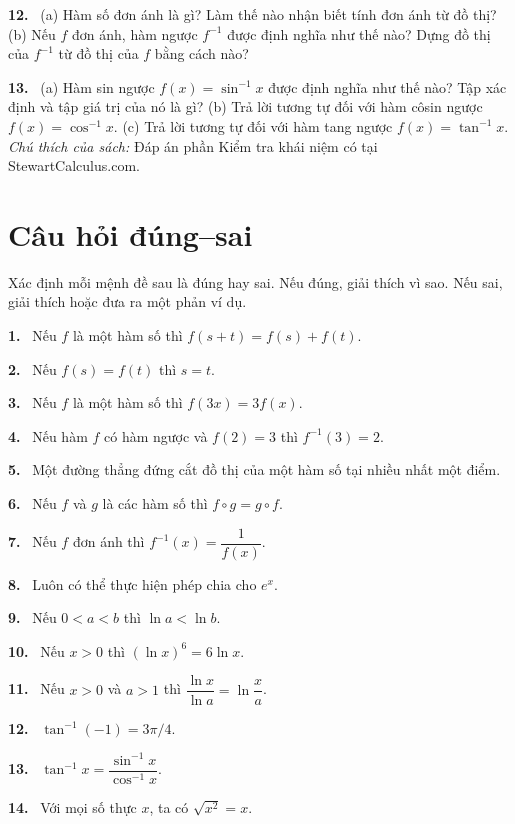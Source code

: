\documentclass[12pt,a4paper]{article}
\newcommand{\bt}[1]{\par\smallskip\noindent\textbf{#1.}\ }
\begin{document}
\bt{12} (a) Hàm số đơn ánh là gì? Làm thế nào nhận biết tính đơn ánh từ đồ thị? (b) Nếu $f$ đơn ánh, hàm ngược $f^{-1}$ được định nghĩa như thế nào? Dựng đồ thị của $f^{-1}$ từ đồ thị của $f$ bằng cách nào?
\bt{13} (a) Hàm sin ngược $f(x)=\sin^{-1}x$ được định nghĩa như thế nào? Tập xác định và tập giá trị của nó là gì? (b) Trả lời tương tự đối với hàm côsin ngược $f(x)=\cos^{-1}x$. (c) Trả lời tương tự đối với hàm tang ngược $f(x)=\tan^{-1}x$.
\noindent\textit{Chú thích của sách:} Đáp án phần Kiểm tra khái niệm có tại StewartCalculus.com.
\section*{Câu hỏi đúng–sai}
Xác định mỗi mệnh đề sau là đúng hay sai. Nếu đúng, giải thích vì sao. Nếu sai, giải thích hoặc đưa ra một phản ví dụ.
\bt{1} Nếu $f$ là một hàm số thì $f(s+t)=f(s)+f(t)$.
\bt{2} Nếu $f(s)=f(t)$ thì $s=t$.
\bt{3} Nếu $f$ là một hàm số thì $f(3x)=3f(x)$.
\bt{4} Nếu hàm $f$ có hàm ngược và $f(2)=3$ thì $f^{-1}(3)=2$.
\bt{5} Một đường thẳng đứng cắt đồ thị của một hàm số tại nhiều nhất một điểm.
\bt{6} Nếu $f$ và $g$ là các hàm số thì $f\circ g=g\circ f$.
\bt{7} Nếu $f$ đơn ánh thì $f^{-1}(x)=\dfrac1{f(x)}$.
\bt{8} Luôn có thể thực hiện phép chia cho $e^x$.
\bt{9} Nếu $0<a<b$ thì $\ln a<\ln b$.
\bt{10} Nếu $x>0$ thì $(\ln x)^6=6\ln x$.
\bt{11} Nếu $x>0$ và $a>1$ thì $\dfrac{\ln x}{\ln a}=\ln\dfrac xa$.
\bt{12} $\tan^{-1}(-1)=3\pi/4$.
\bt{13} $\tan^{-1}x=\dfrac{\sin^{-1}x}{\cos^{-1}x}$.
\bt{14} Với mọi số thực $x$, ta có $\sqrt{x^2}=x$.
\end{document}
